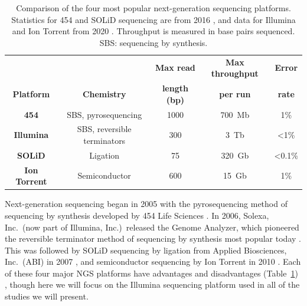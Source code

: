 \begin{table}[H]
	\begin{center}
		\begin{tabular}{ccccc}
			& & \textbf{Max read} & \textbf{Max throughput} & \textbf{Error} \\
			\textbf{Platform} & \textbf{Chemistry} & \textbf{length (bp)} & \textbf{per run} & \textbf{rate} \\
			\hline
			\textbf{454} & SBS, pyrosequencing & 1000 & 700~Mb & 1\% \\
			\textbf{Illumina} & SBS, reversible terminators & 300 & 3~Tb & \textless{}1\% \\
			\textbf{SOLiD} & Ligation & 75 & 320~Gb & \textless{}0.1\% \\
			\textbf{Ion Torrent} & Semiconductor & 600 & 15~Gb & 1\%
		\end{tabular}
	\end{center}
	\vspace{-0.3cm}
	\caption[Comparison of major NGS platforms.]{Comparison of the four most popular next-generation sequencing platforms. Statistics for 454 and SOLiD sequencing are from 2016 \cite{goodwin2016}, and data for Illumina and Ion Torrent from 2020 \cite{kanzi2020}. Throughput is measured in base pairs sequenced. SBS: sequencing by synthesis.}
	\label{table:intro:ngs_platform_comparison}
\end{table}
Next-generation sequencing began in 2005 with the pyrosequencing method of sequencing by synthesis developed by 454 Life Sciences \cite{margulies2005}. In 2006, Solexa, Inc.\ (now part of Illumina, Inc.)\ released the Genome Analyzer, which pioneered the reversible terminator method of sequencing by synthesis most popular today \cite{bennett2004,bentley2008}. This was followed by SOLiD sequencing by ligation from Applied Biosciences, Inc.\ (ABI) in 2007 \cite{valouev2008}, and semiconductor sequencing by Ion Torrent in 2010 \cite{rothberg2011}. Each of these four major NGS platforms have advantages and disadvantages (Table~\ref{table:intro:ngs_platform_comparison}) \cite{goodwin2016,kanzi2020}, though here we will focus on the Illumina sequencing platform used in all of the studies we will present.

